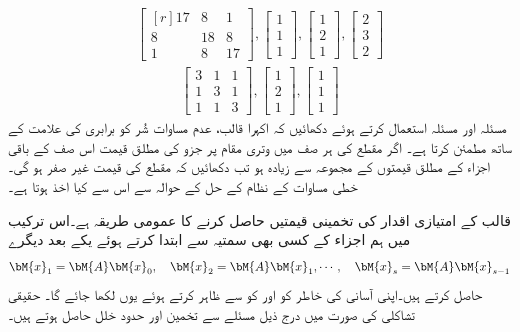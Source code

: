\quad
\begin{align*}
\begin{bmatrix*}[r]17&8&1\\ 8&18&8\\1&8&17\end{bmatrix*}, \begin{bmatrix}1\\1\\1  \end{bmatrix}, \begin{bmatrix}1\\2\\1  \end{bmatrix},
\begin{bmatrix}2\\3\\2  \end{bmatrix}
\end{align*}
\begin{align*}
\begin{bmatrix} 3&1&1\\1&3&1\\1&1&3 \end{bmatrix},\begin{bmatrix}1\\2\\1  \end{bmatrix},\begin{bmatrix}1\\1\\1  \end{bmatrix}
\end{align*}
\quad
مسئلہ  اور مسئلہ  استعمال کرتے ہوئے دکھائیں کہ اکہرا قالب،  عدم مساوات شُر کو برابری کی علامت کے ساتھ مطمئن کرتا ہے۔ 
\quad {} \quad
اگر مقطع کی  ہر صف میں وتری مقام پر جزو کی  مطلق قیمت اس صف کے باقی اجزاء کے مطلق قیمتوں کے مجموعہ سے زیادہ ہو تب دکھائیں کہ مقطع کی قیمت غیر صفر ہو گی۔خطی مساوات کے نظام کے حل کے حوالہ سے اس سے کیا اخذ ہوتا  ہے۔


 قالب  کے امتیازی اقدار کی تخمینی قیمتیں حاصل کرنے کا عمومی طریقہ  ہے۔اس ترکیب میں ہم   اجزاء کے کسی بھی سمتیہ  سے ابتدا کرتے ہوئے  یکے بعد دیگرے
\begin{align*}
\bM{x}_1=\bM{A}\bM{x}_0,\quad \bM{x}_2=\bM{A}\bM{x}_1,\cdots,\quad \bM{x}_s=\bM{A}\bM{x}_{s-1}
\end{align*}
حاصل کرتے ہیں۔اپنی آسانی کی خاطر   کو  اور  کو  سے ظاہر کرتے ہوئے یوں  لکھا جائے گا۔ حقیقی تشاکلی  کی صورت میں درج ذیل مسئلے  سے تخمین اور حدود خلل حاصل ہوتے ہیں۔

